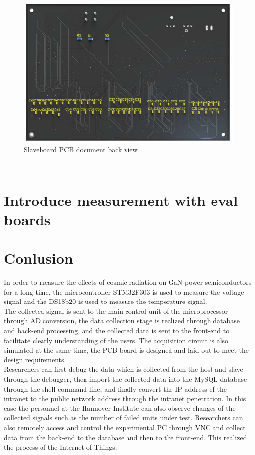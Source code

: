 \begin{figure}[!ht]
	\centering
	\includegraphics[width=16cm]{grafiken/6.17.pdf}
	\caption{Slaveboard PCB document back view} 
	\label{fig:6.17}
\end{figure}
\FloatBarrier
\\



\chapter{Introduce measurement with eval boards }
\label{chap:Introduce measurement with eval boards }
 

\chapter{Conlusion}
\label{chap:Conlusion}
In order to measure the effects of cosmic radiation on GaN power semiconductors for a long time, the microcontroller STM32F303 is used to measure the voltage signal and the DS18b20 is used to measure the temperature signal.
\\
The collected signal is sent to the main control unit of the microprocessor through AD conversion, the data collection stage is realized through database and back-end processing, and the collected data is sent to the front-end to facilitate clearly understanding of the users.
The acquisition circuit is also simulated at the same time, the PCB board is designed and laid out to meet the design requirements.
\\
Researchers can first debug the data which is collected from the host and slave through the debugger, then import the collected data into the MySQL database through the shell command line, and finally convert the IP address of the intranet to the public network address through the intranet penetration. In this case the personnel at the Hannover Institute can also observe changes of the collected signals such as the number of failed units under test. Researchers can also remotely access and control the experimental PC through VNC and collect data from the back-end to the database and then to the front-end. This realized the process of the Internet of Things.



